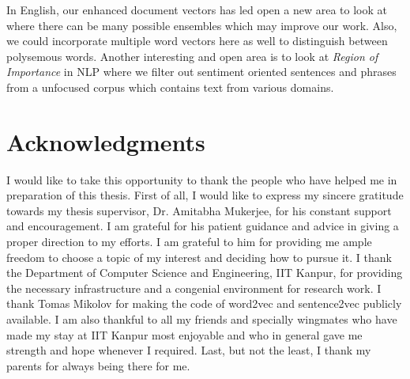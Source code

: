 \documentclass[11pt,a4paper]{article}
\begin{document}
In English, our enhanced document vectors has led open a new area to look at where there can be many possible ensembles which may improve our work. Also, we could incorporate multiple word vectors here as well to distinguish between polysemous words. Another interesting and open area is to look at \emph{Region of Importance} in NLP where we filter out sentiment oriented sentences and phrases from a unfocused corpus which contains text from various domains.

\section*{Acknowledgments}

I would like to take this opportunity to thank the people who have helped me in preparation of this thesis.
First of all, I would like to express my sincere gratitude towards my thesis supervisor, Dr. Amitabha Mukerjee, for his  constant support and encouragement. I am grateful for his patient guidance and advice in giving a proper direction to my efforts. I am grateful to him for providing me ample freedom to choose a topic of my interest and deciding how to pursue it.
I thank the Department of Computer Science and Engineering, IIT Kanpur, for providing the necessary infrastructure and a congenial environment for research work. I thank Tomas Mikolov for making the code of word2vec and sentence2vec publicly available.
I am also thankful to all my friends and specially wingmates who have made my stay at IIT Kanpur most enjoyable and who in general gave me strength and hope whenever I required.
Last, but not the least, I thank my parents for always being there for me.



\end{document}
